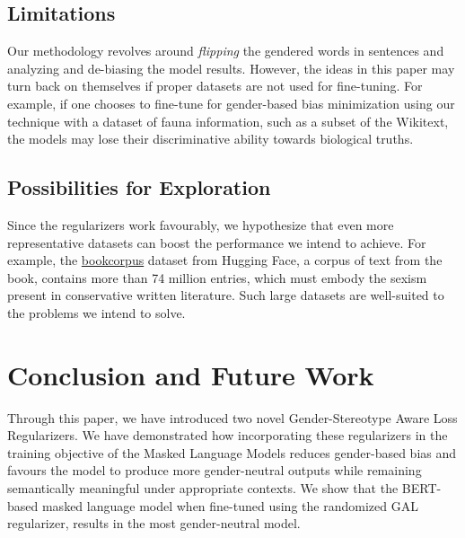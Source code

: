 \documentclass[10pt,twocolumn,letterpaper]{article}
\begin{document}
\subsection{Limitations}
Our methodology revolves around \textit{flipping} the gendered words in sentences and analyzing and de-biasing the model results.
However, the ideas in this paper may turn back on themselves if proper datasets are not used for fine-tuning.
For example, if one chooses to fine-tune for gender-based bias minimization using our technique with a dataset of fauna information, such as a subset of the Wikitext, the models may lose their discriminative ability towards biological truths.

\subsection{Possibilities for Exploration}
Since the regularizers work favourably, we hypothesize that even more representative datasets can boost the performance we intend to achieve.
For example, the \href{https://huggingface.co/datasets/bookcorpus}{bookcorpus} dataset from Hugging Face, a corpus of text from the book, contains more than 74 million entries, which must embody the sexism present in conservative written literature.
Such large datasets are well-suited to the problems we intend to solve.

\section{Conclusion and Future Work}
Through this paper, we have introduced two novel Gender-Stereotype Aware Loss Regularizers.
We have demonstrated how incorporating these regularizers in the training objective of the Masked Language Models reduces gender-based bias and favours the model to produce more gender-neutral outputs while remaining semantically meaningful under appropriate contexts.
We show that the BERT-based masked language model when fine-tuned using the randomized GAL regularizer, results in the most gender-neutral model.
\end{document}
